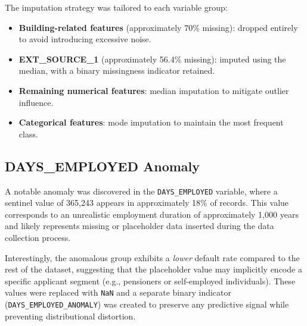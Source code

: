 

The imputation strategy was tailored to each variable group:
\begin{itemize}
    \item \textbf{Building-related features} (approximately 70\% missing): dropped entirely to avoid introducing excessive noise.
    \item \textbf{EXT\_SOURCE\_1} (approximately 56.4\% missing): imputed using the median, with a binary missingness indicator retained.
    \item \textbf{Remaining numerical features}: median imputation to mitigate outlier influence.
    \item \textbf{Categorical features}: mode imputation to maintain the most frequent class.
\end{itemize}

\subsection{DAYS\_EMPLOYED Anomaly}

A notable anomaly was discovered in the \texttt{DAYS\_EMPLOYED} variable, where a sentinel value of 365,243 appears in approximately 18\% of records. This value corresponds to an unrealistic employment duration of approximately 1,000 years and likely represents missing or placeholder data inserted during the data collection process.



Interestingly, the anomalous group exhibits a \textit{lower} default rate compared to the rest of the dataset, suggesting that the placeholder value may implicitly encode a specific applicant segment (e.g., pensioners or self-employed individuals). These values were replaced with \texttt{NaN} and a separate binary indicator (\texttt{DAYS\_EMPLOYED\_ANOMALY}) was created to preserve any predictive signal while preventing distributional distortion.

